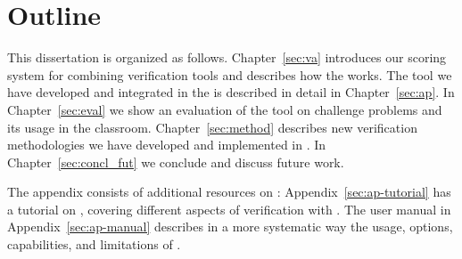 \section{Outline}

This dissertation is organized as follows.
Chapter~\ref{sec:va} introduces our scoring system for combining verification tools and describes how the \VAssist works.
The \AutoProof tool we have developed and integrated in the \VAssist is described in detail in Chapter~\ref{sec:ap}.
In Chapter~\ref{sec:eval} we show an evaluation of the \AutoProof tool on challenge problems and its usage in the classroom.
Chapter~\ref{sec:method} describes new verification methodologies we have developed and implemented in \AutoProof.
In Chapter~\ref{sec:concl_fut} we conclude and discuss future work.

The appendix consists of additional resources on \AutoProof: 
Appendix~\ref{sec:ap-tutorial} has a tutorial on \AutoProof, covering different aspects of verification with \AutoProof. The \AutoProof user manual in Appendix~\ref{sec:ap-manual} describes in a more systematic way the usage, options, capabilities, and limitations of \AutoProof.

